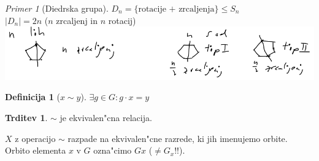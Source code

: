 \documentclass[a4paper,12pt]{article}
\theoremstyle{definition}
\newtheorem{defn}[counter]{Definicija}
\newtheorem{claim}[counter]{Trditev}
\theoremstyle{remark}
\newtheorem*{ex}{Primer}
\begin{document}
\begin{ex}[Diedrska grupa]
	$D_n = \lbrace \text{rotacije + zrcaljenja} \rbrace \leq S_n$\\
	$|D_n| = 2n$ ($n$ zrcaljenj in $n$ rotacij)
	\\
	\includegraphics{diedrska}
\end{ex}
\begin{defn}[$x \sim y$]
	$\exists g \in G: g \cdot x = y$
\end{defn}
\begin{claim}
	$\sim$ je ekvivalen"cna relacija.
\end{claim}
$X$ z operacijo $\sim$ razpade na ekvivalen"cne razrede, ki jih imenujemo orbite. Orbito elementa $x$ v $G$ ozna"cimo $Gx$ ($\neq G_x$!!).
\end{document}
